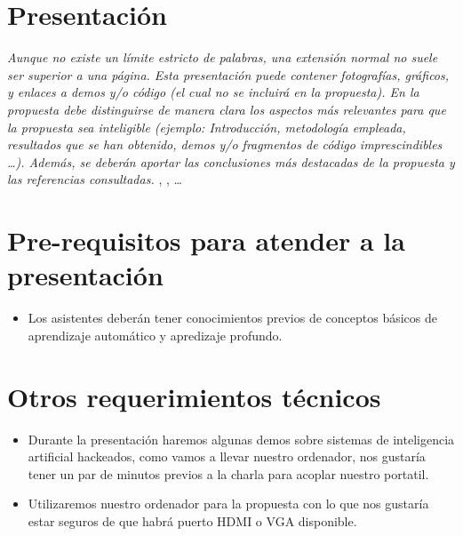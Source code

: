 \documentclass[runningheads]{llncs}
\begin{document}
\section{Presentaci\'on}

\textit{Aunque no existe un l\'imite estricto de palabras, una extensi\'on normal no suele ser superior a una p\'agina. Esta presentaci\'on puede contener fotograf\'ias, gr\'aficos, y enlaces a demos y/o c\'odigo (el cual no se incluir\'a en la propuesta). En la propuesta debe distinguirse de manera clara los aspectos m\'as relevantes para que la propuesta sea inteligible (ejemplo: Introducci\'on, metodolog\'ia empleada, resultados que se han obtenido, demos y/o fragmentos de c\'odigo imprescindibles \dots). Adem\'as, se deber\'an aportar las conclusiones m\'as destacadas de la propuesta y las referencias consultadas.}
\cite{Alpher02},
\cite{Alpher03}, \cite{Alpher04} \dots


\section{Pre-requisitos para atender a la presentación}
\begin{itemize}
\item  Los asistentes deber\'an tener conocimientos previos de conceptos básicos de aprendizaje autom\'atico y apredizaje profundo. 
\end{itemize}

\section{Otros requerimientos t\'ecnicos}
\begin{itemize}
 \item Durante la presentación haremos algunas demos sobre sistemas de inteligencia artificial hackeados, como vamos a llevar nuestro ordenador, nos gustaría tener un par de minutos previos a la charla para acoplar nuestro portatil.

 \item Utilizaremos nuestro ordenador  para la propuesta con lo que nos gustaría estar seguros de que habrá puerto HDMI o VGA disponible. 
\end{itemize}

\clearpage



\end{document}
